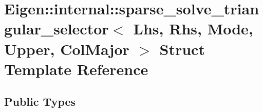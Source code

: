 \hypertarget{struct_eigen_1_1internal_1_1sparse__solve__triangular__selector_3_01_lhs_00_01_rhs_00_01_mode_00_01_upper_00_01_col_major_01_4}{}\section{Eigen\+:\+:internal\+:\+:sparse\+\_\+solve\+\_\+triangular\+\_\+selector$<$ Lhs, Rhs, Mode, Upper, Col\+Major $>$ Struct Template Reference}
\label{struct_eigen_1_1internal_1_1sparse__solve__triangular__selector_3_01_lhs_00_01_rhs_00_01_mode_00_01_upper_00_01_col_major_01_4}
\subsection*{Public Types}
